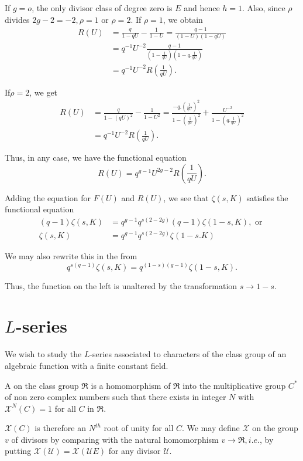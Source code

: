 If $g=o$, the only divisor class of degree zero is $E$ and hence $h
=1$. Also, since $\rho$ divides $2g -2 =-2, \rho =1 \text{ or } \rho
=2$. If $\rho = 1$, we obtain 
\begin{align*}
   R (U) & = \frac{q}{1-qU} - \frac{1}{1-U}= \frac{q-1}{(1-U) (1-qU)}\\
  & = q^{-1} U^{-2} \frac{q-1}{\left(1- \frac{1}{qU}\right) \left(1-q
     .\frac{1}{qU}\right)}\\ 
  & = q^{-1} U^{-2} R \left(\frac{1}{qU}\right).
\end{align*}

If\pageoriginale $\rho =2$, we get
\begin{align*}
  R(U) & = \frac{q}{1-(qU)^2} - \frac{1}{1-U^2} =
  \frac{-q. \left(\frac{1}{qU}\right)^2}{1- \left(\frac{1}{qU}\right)^2} +
  \frac{U^{-2}}{1-\left(q.\frac{1}{qU}\right)^2}\\ 
  & = q^{-1} U^{-2} R \left(\frac{1}{qU}\right).
\end{align*}

Thus, in any case, we have the functional equation
$$
R (U) = q^{g-1} U^{2g-2} R \left(\frac{1}{qU}\right).
$$

Adding the equation for $F (U)$ and $R(U)$, we see that $\zeta (s, K)$
satisfies the functional equation 
\begin{align*}
  (q-1) \zeta  (s,K) & = q^{g-1} q^{s (2-2g)} (q-1) \zeta (1-s,K), \text{ or }\\
  \zeta(s,K) & =q^{g-1} q^{s (2-2g)} \zeta (1-s.K)
\end{align*}

We may also rewrite this in the from
$$
q^{s (q-1)} \zeta (s,K) = q ^{(1-s) (g-1)} \zeta (1-s,K).
$$

Thus, the function on the left is unaltered by the transformation $s
\to 1-s$. 

\section{\texorpdfstring{$L$}{L}-series}\label{chap11:sec:24} %

We wish to study the $L$-series associated to characters of the class
group of an algebraic function with a finite constant field.  

\begin{defi*}
  A on the class group
  $\mathfrak{R}$ is a homomorphism of $\mathfrak{R}$ into the
  multiplicative group $C^*$ of non zero complex numbers such that
  there exists in integer $N$ with $\mathcal{X}^N (C) =1$ for all $C$
  in $\mathfrak{R}$.  

  $\mathcal{X} (C)$ is therefore an $N^{th}$ root of unity for all
  $C$.  We may define $\mathcal{X}$ on the group $v$ of divisors
  by comparing with the natural homomorphism $v \to \mathfrak{R},
  i.e$., by putting $\mathcal{X} (\mathscr{U}) = \mathcal{X}
  (\mathscr{U} E)$ for any divisor $\mathscr{U}$. 
\end{defi*}

